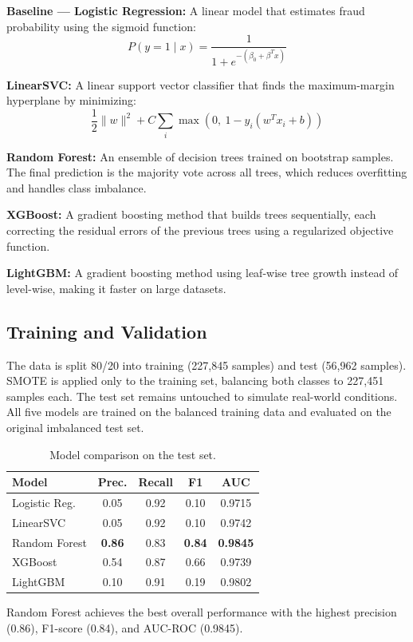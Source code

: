 \documentclass{article}
\begin{document}
\textbf{Baseline --- Logistic Regression:} A linear model that estimates
fraud probability using the sigmoid function:
\[
  P(y=1 \mid x) = \frac{1}{1 + e^{-(\beta_0 + \beta^T x)}}
\]

\textbf{LinearSVC:} A linear support vector classifier that finds the
maximum-margin hyperplane by minimizing:
\[
  \frac{1}{2}\|w\|^2 + C \sum_{i}
  \max\!\left(0,\ 1 - y_i(w^T x_i + b)\right)
\]

\textbf{Random Forest:} An ensemble of decision trees trained on
bootstrap samples. The final prediction is the majority vote across all
trees, which reduces overfitting and handles class imbalance.

\textbf{XGBoost:} A gradient boosting method that builds trees
sequentially, each correcting the residual errors of the previous trees
using a regularized objective function.

\textbf{LightGBM:} A gradient boosting method using leaf-wise tree
growth instead of level-wise, making it faster on large datasets.

\subsection{Training and Validation}

The data is split 80/20 into training (227,845 samples) and test
(56,962 samples). SMOTE is applied only to the training set, balancing
both classes to 227,451 samples each. The test set remains untouched to
simulate real-world conditions. All five models are trained on the
balanced training data and evaluated on the original imbalanced test set.

\begin{table}[h]
\centering
\caption{Model comparison on the test set.}
\label{tab:results}
\vskip 0.1in
\begin{small}
\begin{tabular}{lcccc}
\toprule
Model & Prec. & Recall & F1 & AUC \\
\midrule
Logistic Reg.  & 0.05 & 0.92 & 0.10 & 0.9715 \\
LinearSVC      & 0.05 & 0.92 & 0.10 & 0.9742 \\
Random Forest  & \textbf{0.86} & 0.83 & \textbf{0.84} & \textbf{0.9845} \\
XGBoost        & 0.54 & 0.87 & 0.66 & 0.9739 \\
LightGBM       & 0.10 & 0.91 & 0.19 & 0.9802 \\
\bottomrule
\end{tabular}
\end{small}
\end{table}

Random Forest achieves the best overall performance with the highest
precision (0.86), F1-score (0.84), and AUC-ROC (0.9845).



\end{document}

